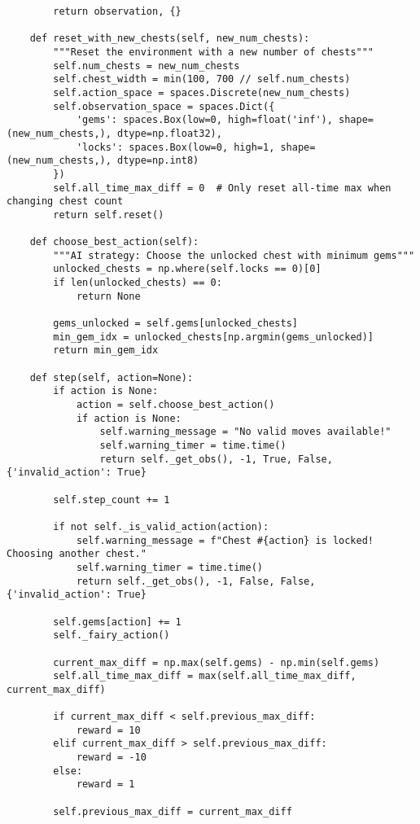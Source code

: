 \begin{lstlisting}
        return observation, {}

    def reset_with_new_chests(self, new_num_chests):
        """Reset the environment with a new number of chests"""
        self.num_chests = new_num_chests
        self.chest_width = min(100, 700 // self.num_chests)
        self.action_space = spaces.Discrete(new_num_chests)
        self.observation_space = spaces.Dict({
            'gems': spaces.Box(low=0, high=float('inf'), shape=(new_num_chests,), dtype=np.float32),
            'locks': spaces.Box(low=0, high=1, shape=(new_num_chests,), dtype=np.int8)
        })
        self.all_time_max_diff = 0  # Only reset all-time max when changing chest count
        return self.reset()
    
    def choose_best_action(self):
        """AI strategy: Choose the unlocked chest with minimum gems"""
        unlocked_chests = np.where(self.locks == 0)[0]
        if len(unlocked_chests) == 0:
            return None
        
        gems_unlocked = self.gems[unlocked_chests]
        min_gem_idx = unlocked_chests[np.argmin(gems_unlocked)]
        return min_gem_idx

    def step(self, action=None):
        if action is None:
            action = self.choose_best_action()
            if action is None:
                self.warning_message = "No valid moves available!"
                self.warning_timer = time.time()
                return self._get_obs(), -1, True, False, {'invalid_action': True}
        
        self.step_count += 1
        
        if not self._is_valid_action(action):
            self.warning_message = f"Chest #{action} is locked! Choosing another chest."
            self.warning_timer = time.time()
            return self._get_obs(), -1, False, False, {'invalid_action': True}
        
        self.gems[action] += 1
        self._fairy_action()
        
        current_max_diff = np.max(self.gems) - np.min(self.gems)
        self.all_time_max_diff = max(self.all_time_max_diff, current_max_diff)
        
        if current_max_diff < self.previous_max_diff:
            reward = 10
        elif current_max_diff > self.previous_max_diff:
            reward = -10
        else:
            reward = 1
            
        self.previous_max_diff = current_max_diff
        

\end{lstlisting}

